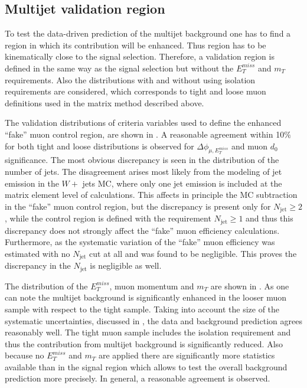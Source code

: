 \subsection{Multijet validation region}

To test the data-driven prediction of the multijet background one 
has to find a region
in which its contribution will be enhanced. 
Thus region has to be kinematically 
close to the signal selection.
Therefore, a validation region is defined in the same way as the signal selection but without the $E_T^{miss}$ and $m_T$ requirements. 
Also the distributions with and without using isolation requirements are considered, 
which corresponds to tight and loose muon definitions used in the matrix method described above.

The validation distributions of criteria variables used to define the enhanced ``fake'' muon control region, are shown in .
A reasonable agreement within 10$\%$ for both tight and loose distributions is observed for $\Delta\phi_{\mu,E_T^{miss}}$ and muon $d_0$ significance.
The most obvious discrepancy is seen in the
distribution of the number of jets. The disagreement arises most likely from the modeling of jet emission in the $W +$ jets MC, where only one jet emission is included at the
matrix element level of calculations.
This affects in principle the MC subtraction in the ``fake'' muon control region,
but the discrepancy is present only for $N_\mathrm{jet}\geq2$, while the control region is 
defined with the requirement $N_\mathrm{jet}\geq1$ and thus this discrepancy does not strongly affect the ``fake'' muon efficiency calculations.
Furthermore, as the systematic variation of the ``fake'' muon efficiency was estimated with no $N_\mathrm{jet}$ cut at all and was found to be negligible. This proves the discrepancy in the $N_\mathrm{jet}$ is negligible as well.

The distribution of the $E_T^{miss}$, muon momentum and $m_T$ are shown in .
As one can note the multijet background is significantly enhanced in the looser muon sample with respect to the tight sample. 
Taking into account the size of the systematic uncertainties, discussed in , the data and background prediction agrees reasonably well. 
The tight muon sample includes the isolation requirement and thus the contribution from multijet background is significantly reduced. Also because no $E_T^{miss}$ and $m_T$ are applied 
there are significantly more statistics available than in the signal region which allows to test the overall background prediction more precisely. In general, a reasonable agreement is observed. 

